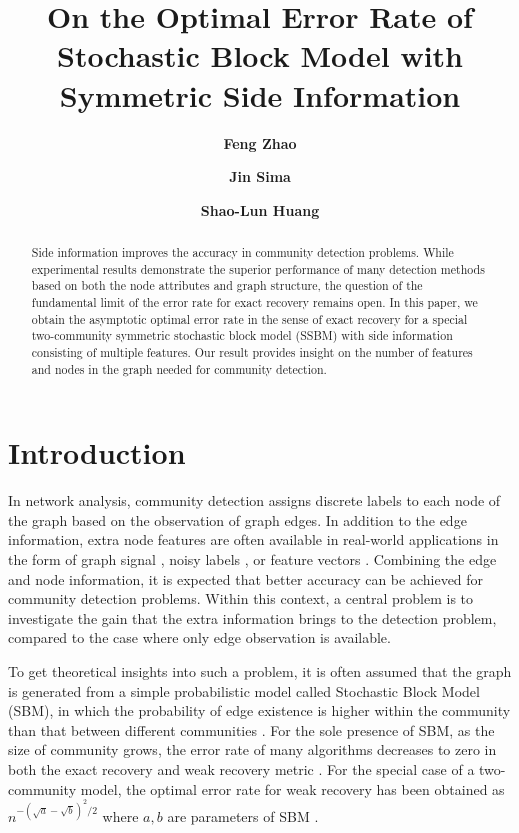 \documentclass[conference,letterpaper]{IEEEtran}
\title{On the Optimal Error Rate of Stochastic Block Model with Symmetric Side Information}
\author[1]{\textbf{Feng Zhao}}
\author[2]{\textbf{Jin Sima}}
\author[3]{\textbf{Shao-Lun Huang}}
\affil[1]{\normalsize{Department of Electronic Engineering,
		Tsinghua University, 
		Beijing, China 100084}}
\affil[2]{\normalsize{Department of Electrical Engineering, California Institute of Technology, Pasadena 91125, CA, USA}}
\affil[3]{\normalsize{DSIT Research Center,
		Tsinghua-Berkeley Shenzhen Institute,
		Shenzhen, China 518055}}
\begin{document}
\maketitle
\begin{abstract}
    Side information improves the accuracy in community detection problems.
    While experimental results demonstrate the superior performance of many detection methods
    based on both the node attributes and graph structure, the question of the fundamental limit of the error rate for exact recovery remains open.
    In this paper, we obtain the asymptotic optimal error rate in the sense of 
    exact recovery for a special two-community symmetric stochastic block model (SSBM) with side information consisting of multiple features.
    Our result provides insight on the number of features and nodes in the graph needed for community detection.
\end{abstract}
\section{Introduction}
In network analysis, community detection assigns discrete labels to each node of the graph based on the observation of graph edges.
In addition to the edge information, extra node features are often available in real-world applications in the form of graph signal \cite{dong2020graph},
noisy labels \cite{mossel2016local}, or
feature vectors \cite{zhang2016community}. Combining the edge and node information, it is expected that better
accuracy can be achieved for community detection problems. Within this context, a central problem 
is to investigate the gain that the extra information brings to the detection problem, compared to the case where only edge observation is available.

To get theoretical insights into such a problem, it is often assumed that the graph is generated from a simple probabilistic model called Stochastic Block Model (SBM), in which the probability of edge existence is higher within the community than that between different communities \cite{holland1983stochastic}. For the sole presence of SBM, as the size of community grows, the error rate of many algorithms decreases to zero in both the exact recovery and weak recovery metric \cite{yun2014accurate,fei2019achieving}. For the special case of a two-community model,
the optimal error rate for weak recovery has been obtained as $n^{-(\sqrt{a} - \sqrt{b})^2/2}$ where $a,b$ are parameters of SBM \cite{zhang2016}.
\end{document}
